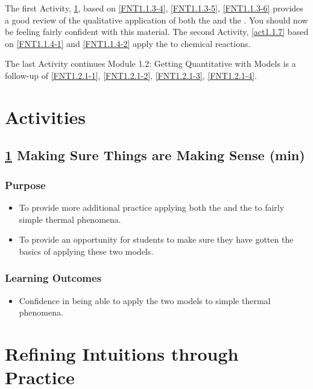  {
	The first \CLASP{} Activity, \ref{act1.1.6}, based on \ref{FNT1.1.3-4}, \ref{FNT1.1.3-5}, \ref{FNT1.1.3-6} provides a good review of the qualitative application of both the \ThreePhaseModel{} and the \EnergyInteractionModel{}. You should now be feeling fairly confident with this material. The second Activity, \ref{act1.1.7} based on \ref{FNT1.1.4-1} and \ref{FNT1.1.4-2} apply the \EnergyInteractionModel{} to chemical reactions. 

The last \CLASP{} Activity continues Module 1.2: Getting Quantitative with Models is a follow-up of \ref{FNT1.2.1-1}, \ref{FNT1.2.1-2}, \ref{FNT1.2.1-3}, \ref{FNT1.2.1-4}.
	
\section*{\CLASP{} Activities}
	
\subsection*{\ref{act1.1.6} Making Sure Things are Making Sense	(\about\unit[35]{min})}
	
\subsubsection*{Purpose}

\begin{itemize}
	\item To provide more additional practice applying both the \ThreePhaseModel{} and the \EnergyInteractionModel{} to fairly simple thermal phenomena.
	\item To provide an opportunity for students to make sure they have gotten the basics of applying these two models.
\end{itemize}

\subsubsection*{Learning Outcomes}
\begin{itemize}
	\item Confidence in being able to apply the two models to simple thermal phenomena.
\end{itemize}

}


\section{Refining Intuitions through Practice}
\label{act1.1.6}

